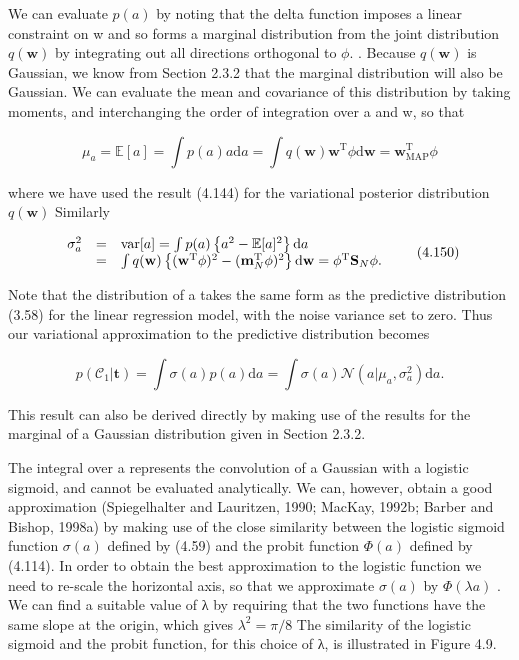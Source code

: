 \documentclass[
  10
]{article}
\begin{document}
We can evaluate \(p ( a )\) by noting that the delta function imposes a
linear constraint on w and so forms a marginal distribution from the
joint distribution \(q ( \mathbf { w } )\) by integrating out all
directions orthogonal to \(\phi .\) . Because \(q ( \mathbf { w } )\) is
Gaussian, we know from Section 2.3.2 that the marginal distribution will
also be Gaussian. We can evaluate the mean and covariance of this
distribution by taking moments, and interchanging the order of
integration over a and w, so that

\[
\mu_ {a} = \mathbb {E} [ a ] = \int p (a) a \mathrm{d} a = \int q (\mathbf {w}) \mathbf {w} ^ {\mathrm{T}} \phi \mathrm{d} \mathbf {w} = \mathbf {w} _ {\mathrm{MAP}} ^ {\mathrm{T}} \phi\tag{4.149}
\]

where we have used the result (4.144) for the variational posterior
distribution \(q ( \mathbf { w } )\) Similarly

\[
\begin{array}{r c l} \sigma_ {a} ^ {2} & = & \operatorname{var} [ a ] = \int p (a) \left\{a ^ {2} - \mathbb {E} [ a ] ^ {2} \right\} \mathrm{d} a \\ & = & \int q (\mathbf {w}) \left\{(\mathbf {w} ^ {\mathrm{T}} \phi) ^ {2} - (\mathbf {m} _ {N} ^ {\mathrm{T}} \phi) ^ {2} \right\} \mathrm{d} \mathbf {w} = \phi^ {\mathrm{T}} \mathbf {S} _ {N} \phi . \end{array}\tag{4.150}
\]

Note that the distribution of a takes the same form as the predictive
distribution (3.58) for the linear regression model, with the noise
variance set to zero. Thus our variational approximation to the
predictive distribution becomes

\[
p (\mathcal {C} _ {1} | \mathbf {t}) = \int \sigma (a) p (a) \mathrm{d} a = \int \sigma (a) \mathcal {N} (a | \mu_ {a}, \sigma_ {a} ^ {2}) \mathrm{d} a.\tag{4.151}
\]

This result can also be derived directly by making use of the results
for the marginal of a Gaussian distribution given in Section 2.3.2.

The integral over a represents the convolution of a Gaussian with a
logistic sigmoid, and cannot be evaluated analytically. We can, however,
obtain a good approximation (Spiegelhalter and Lauritzen, 1990; MacKay,
1992b; Barber and Bishop, 1998a) by making use of the close similarity
between the logistic sigmoid function \(\sigma ( a )\) defined by (4.59)
and the probit function \(\Phi ( a )\) defined by (4.114). In order to
obtain the best approximation to the logistic function we need to
re-scale the horizontal axis, so that we approximate \(\sigma ( a )\) by
\(\Phi ( \lambda a )\) . We can find a suitable value of λ by requiring
that the two functions have the same slope at the origin, which gives
\(\lambda ^ { 2 } = \pi / 8\) The similarity of the logistic sigmoid and
the probit function, for this choice of λ, is illustrated in Figure 4.9.
\end{document}
